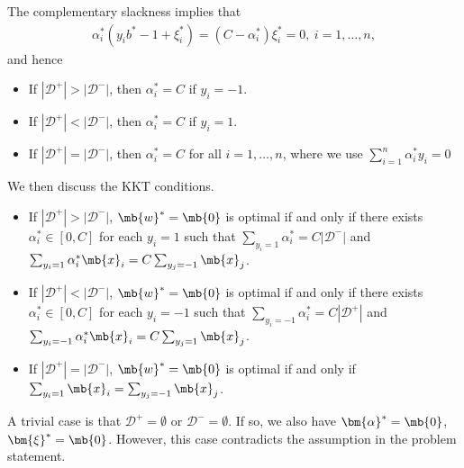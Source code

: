 \begin{exercise}
\begin{enumerate}
\begin{solution}
\begin{enumerate}
                        The complementary slackness implies that
                        \begin{align*}
                            \alpha_i^* (y_i b^* - 1 + \xi_i^*) = (C-\alpha_i^*) \xi_i^* = 0,\ i=1,\ldots,n,
                        \end{align*}
                        and hence
                        \begin{itemize}
                            \item If $|\mathcal{D}^+| > |\mathcal{D}^-|$, then $\alpha_i^* = C$ if $y_i = -1$.
                            \item If $|\mathcal{D}^+| < |\mathcal{D}^-|$, then $\alpha_i^* = C$ if $y_i = 1$.
                            \item If $|\mathcal{D}^+| = |\mathcal{D}^-|$, then $\alpha_i^* = C$ for all $i=1,\ldots,n$, where we use $\sum^n_{i = 1} \alpha^*_i y_i= 0$
                        \end{itemize}

                        We then discuss the KKT conditions.
                        \begin{itemize}
                            \item If $|\mathcal{D}^+| > |\mathcal{D}^-|$, $\mb{w}^* = \mb{0}$ is optimal if and only if there exists $\alpha_i^*\in [0,C]$ for each $y_i = 1$ such that $\sum_{y_i = 1} \alpha^*_i = C |\mathcal{D}^-|$ and $\sum_{y_i = 1} \alpha^*_i \mb{x}_i = C \sum_{y_j = -1} \mb{x}_j$.
                            \item If $|\mathcal{D}^+| < |\mathcal{D}^-|$, $\mb{w}^* = \mb{0}$ is optimal if and only if there exists $\alpha_i^*\in [0,C]$ for each $y_i = -1$ such that $\sum_{y_i = -1} \alpha^*_i = C |\mathcal{D}^+|$ and $\sum_{y_i = -1} \alpha^*_i \mb{x}_i = C \sum_{y_j = 1} \mb{x}_j$.
                            \item If $|\mathcal{D}^+| = |\mathcal{D}^-|$, $\mb{w}^* = \mb{0}$ is optimal if and only if $\sum_{y_i = 1} \mb{x}_i = \sum_{y_j = -1} \mb{x}_j$.
                        \end{itemize}

                        A trivial case is that $\mathcal{D}^+ = \emptyset$ or $\mathcal{D}^- = \emptyset$. If so, we also have $\bm{\alpha}^* = \mb{0}$, $\bm{\xi}^* = \mb{0}$. However, this case contradicts the assumption in the problem statement.


\end{enumerate}
\end{solution}
\end{enumerate}
\end{exercise}
